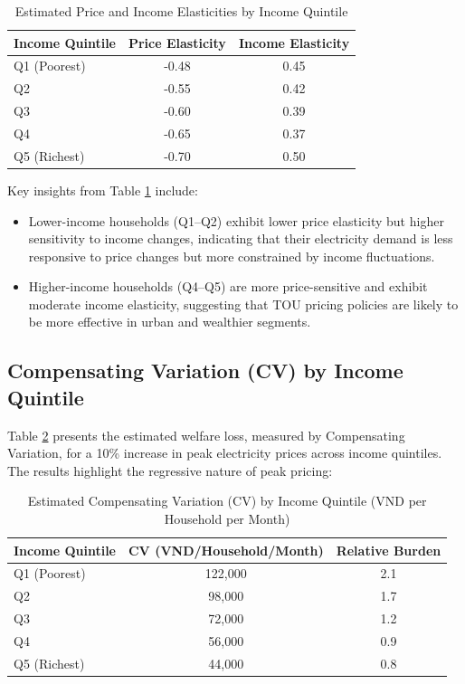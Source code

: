 \documentclass[12pt,a4paper]{article}
\begin{document}
	\begin{table}[H]
		\centering
		\caption{Estimated Price and Income Elasticities by Income Quintile}
		\label{tab:elasticity_quintile}
		\begin{tabular}{lcc}
			\toprule
			Income Quintile & Price Elasticity & Income Elasticity \\
			\midrule
			Q1 (Poorest)    & -0.48           & 0.45 \\
			Q2              & -0.55           & 0.42 \\
			Q3              & -0.60           & 0.39 \\
			Q4              & -0.65           & 0.37 \\
			Q5 (Richest)    & -0.70           & 0.50 \\
			\bottomrule
		\end{tabular}
	\end{table}
	
	\noindent Key insights from Table \ref{tab:elasticity_quintile} include: 
	\begin{itemize}
		\item Lower-income households (Q1–Q2) exhibit lower price elasticity but higher sensitivity to income changes, indicating that their electricity demand is less responsive to price changes but more constrained by income fluctuations.
		\item Higher-income households (Q4–Q5) are more price-sensitive and exhibit moderate income elasticity, suggesting that TOU pricing policies are likely to be more effective in urban and wealthier segments.
	\end{itemize}
	
	\subsection{Compensating Variation (CV) by Income Quintile}
	
	Table \ref{tab:cv_quintile} presents the estimated welfare loss, measured by Compensating Variation, for a 10\% increase in peak electricity prices across income quintiles. The results highlight the regressive nature of peak pricing:
	
	\begin{table}[H]
		\centering
		\caption{Estimated Compensating Variation (CV) by Income Quintile (VND per Household per Month)}
		\label{tab:cv_quintile}
		\begin{tabular}{lcc}
			\toprule
			Income Quintile & CV (VND/Household/Month) & Relative Burden \\
			\midrule
			Q1 (Poorest)    & 122,000 & 2.1 \\
			Q2              & 98,000  & 1.7 \\
			Q3              & 72,000  & 1.2 \\
			Q4              & 56,000  & 0.9 \\
			Q5 (Richest)    & 44,000  & 0.8 \\
			\bottomrule
		\end{tabular}
	\end{table}
	
\end{document}
